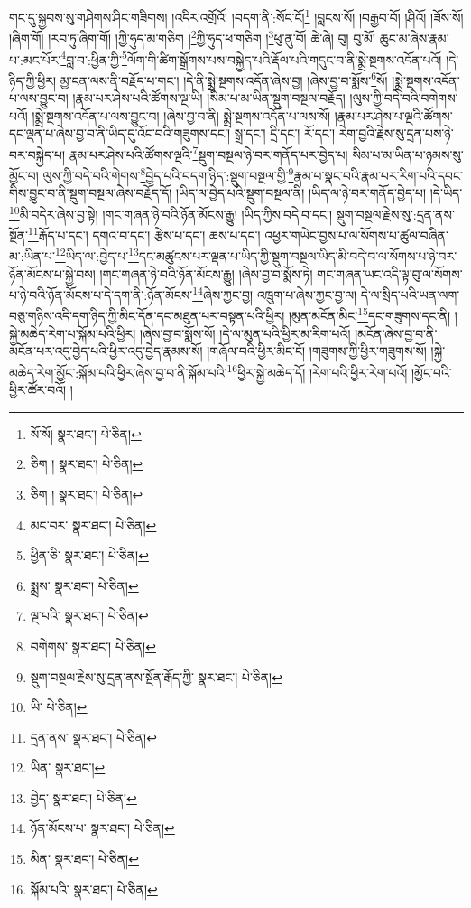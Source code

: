 གང་དུ་སྐྱབས་སུ་གཤེགས་ཤིང་གཟིགས། །འདིར་འགྲོའོ། །བདག་ནི་:སོང་ངོ།\footnote{སོ་སོ།  སྣར་ཐང་།  པེ་ཅིན། } །བླངས་སོ། །བརྒྱབ་བོ། །ཤིའོ། །ཟོས་སོ། །ཞིག་གོ། །རབ་ཏུ་ཞིག་གོ། །ཀྱི་ཧུད་མ་གཅིག །\footnote{ཅིག །  སྣར་ཐང་།  པེ་ཅིན། }ཀྱི་ཧུད་ཕ་གཅིག །\footnote{ཅིག །  སྣར་ཐང་།  པེ་ཅིན། }ཕུ་ནུ་བོ། ཆེ་ཞེ། བུ། བུ་མོ། ཆུང་མ་ཞེས་རྣམ་པ་:མང་པོར་\footnote{མང་བར་  སྣར་ཐང་།  པེ་ཅིན། }བླ་བ་:ཕྱིན་ཀྱི་\footnote{ཕྱིན་ཅི་  སྣར་ཐང་།  པེ་ཅིན། }ལོག་གི་ཚིག་སྒྲོགས་པས་བསྐྱེད་པའི་རྡོལ་པའི་གདུང་བ་ནི་སྨྲེ་སྔགས་འདོན་པའོ། །དེ་ཉིད་ཀྱི་ཕྱིར། མྱ་ངན་ལས་ནི་བརྗོད་པ་གང་། །དེ་ནི་སྨྲེ་སྔགས་འདོན་ཞེས་བྱ། །ཞེས་བྱ་བ་སྨོས་\footnote{སྨྲས་  སྣར་ཐང་།  པེ་ཅིན། }སོ། །སྨྲེ་སྔགས་འདོན་པ་ལས་བྱུང་བ། །རྣམ་པར་ཤེས་པའི་ཚོགས་ལྔ་ཡི། །སིམ་པ་མ་ཡིན་སྡུག་བསྔལ་བརྗོད། །ལུས་ཀྱི་བདེ་བའི་བགེགས་པའོ། །སྨྲེ་སྔགས་འདོན་པ་ལས་བྱུང་བ། །ཞེས་བྱ་བ་ནི། སྨྲེ་སྔགས་འདོན་པ་ལས་སོ། །རྣམ་པར་ཤེས་པ་ལྔའི་ཚོགས་དང་ལྡན་པ་ཞེས་བྱ་བ་ནི་ཡིད་དུ་འོང་བའི་གཟུགས་དང་། སྒྲ་དང་། དྲི་དང་། རོ་དང་། རེག་བྱའི་རྗེས་སུ་དྲན་པས་ཉེ་བར་བསྐྱེད་པ། རྣམ་པར་ཤེས་པའི་ཚོགས་ལྔའི་\footnote{ལྔ་པའི་  སྣར་ཐང་།  པེ་ཅིན། }སྡུག་བསྔལ་ཉེ་བར་གནོད་པར་བྱེད་པ། སིམ་པ་མ་ཡིན་པ་ཉམས་སུ་མྱོང་བ། ལུས་ཀྱི་བདེ་བའི་གེགས་\footnote{བགེགས་  སྣར་ཐང་།  པེ་ཅིན། }བྱེད་པའི་བདག་ཉིད་:སྡུག་བསྔལ་གྱི་\footnote{སྡུག་བསྔལ་རྗེས་སུ་དྲན་ནས་སྔོན་རྒོད་ཀྱི་  སྣར་ཐང་།  པེ་ཅིན། }རྣམ་པ་སྣང་བའི་རྣམ་པར་རིག་པའི་དབང་གིས་བྱུང་བ་ནི་སྡུག་བསྔལ་ཞེས་བརྗོད་དོ། །ཡིད་ལ་བྱེད་པའི་སྡུག་བསྔལ་ནི། །ཡིད་ལ་ཉེ་བར་གནོད་བྱེད་པ། །དེ་ཡིད་\footnote{ཡི་  པེ་ཅིན། }མི་བདེར་ཞེས་བྱ་སྟེ། །གང་གཞན་ཉེ་བའི་ཉོན་མོངས་རྒྱུ། །ཡིད་ཀྱིས་བདེ་བ་དང་། སྡུག་བསྔལ་རྗེས་སུ་:དྲན་ནས་སྔོན་\footnote{དྲན་ནས་  སྣར་ཐང་།  པེ་ཅིན། }རྒོད་པ་དང་། དགའ་བ་དང་། རྩེས་པ་དང་། ཆས་པ་དང་། འཕྱར་གཡེང་བྱས་པ་ལ་སོགས་པ་ཚུལ་བཞིན་མ་:ཡིན་པ་\footnote{ཡིན་  སྣར་ཐང་། }ཡིད་ལ་:བྱེད་པ་\footnote{བྱེད་  སྣར་ཐང་།  པེ་ཅིན། }དང་མཚུངས་པར་ལྡན་པ་ཡིད་ཀྱི་སྡུག་བསྔལ་ཡིད་མི་བདེ་བ་ལ་སོགས་པ་ཉེ་བར་ཉོན་མོངས་པ་སྐྱེ་བས། །གང་གཞན་ཉེ་བའི་ཉོན་མོངས་རྒྱུ། །ཞེས་བྱ་བ་སྨོས་ཏེ། གང་གཞན་ཡང་འདི་ལྟ་བུ་ལ་སོགས་པ་ཉེ་བའི་ཉོན་མོངས་པ་དེ་དག་ནི་:ཉོན་མོངས་\footnote{ཉོན་མོངས་པ་  སྣར་ཐང་།  པེ་ཅིན། }ཞེས་ཀྱང་བྱ། འཁྲུག་པ་ཞེས་ཀྱང་བྱ་ལ། དེ་ལ་སྲིད་པའི་ཡན་ལག་བཅུ་གཉིས་འདི་དག་ཉིད་ཀྱི་མིང་དོན་དང་མཐུན་པར་བསྟན་པའི་ཕྱིར། །མུན་མངོན་མིང་\footnote{མིན་  སྣར་ཐང་།  པེ་ཅིན། }དང་གཟུགས་དང་ནི། །སྐྱེ་མཆེད་རེག་པ་སྐོམ་པའི་ཕྱིར། །ཞེས་བྱ་བ་སྨོས་སོ། །དེ་ལ་མུན་པའི་ཕྱིར་མ་རིག་པའོ། །མངོན་ཞེས་བྱ་བ་ནི་མངོན་པར་འདུ་བྱེད་པའི་ཕྱིར་འདུ་བྱེད་རྣམས་སོ། །གཞོལ་བའི་ཕྱིར་མིང་ངོ། །གཟུགས་ཀྱི་ཕྱིར་གཟུགས་སོ། །སྐྱེ་མཆེད་རེག་མྱོང་:སྐོམ་པའི་ཕྱིར་ཞེས་བྱ་བ་ནི་སྐོམ་པའི་\footnote{སྐོམ་པའི་  སྣར་ཐང་།  པེ་ཅིན། }ཕྱིར་སྐྱེ་མཆེད་དོ། །རེག་པའི་ཕྱིར་རེག་པའོ། །མྱོང་བའི་ཕྱིར་ཚོར་བའོ། །
